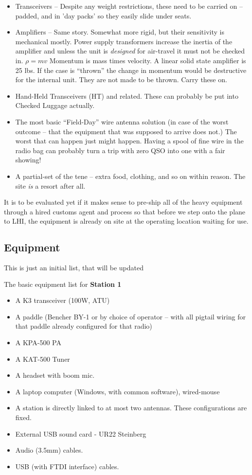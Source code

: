 \documentclass[11pt]{article}
\begin{document}
\begin{itemize}
\item Transceivers -- Despite any weight restrictions, these need to
be carried on -- padded, and in 'day packs' so they easily slide under
seats.
\item Amplifiers -- Same story.  Somewhat more rigid, but their sensitivity
is mechanical mostly.  Power supply transformers increase the inertia of the
amplifier and unless the unit is {\textit{designed}} for air-travel
it must not be checked in. $\rho = mv$  Momentum is mass times
velocity. A linear solid state amplifier is 25 lbs.  If the case is ``thrown''
the change in momentum would be destructive for the internal unit.  They are
not made to be thrown.  Carry these on.
\item Hand-Held Transceivers (HT) and related.  These can probably be put into Checked
Luggage actually.
\item The most basic ``Field-Day'' wire antenna solution (in case of the
worst outcome -- that the equipment that was supposed to arrive does not.)
The worst that can happen just might happen. Having a spool of fine wire
in the radio bag can probably turn a trip with zero QSO into one with a fair
showing!
\item A partial-set of the {\gls{tene}} -- extra food, clothing,
and so on within reason.  The site {\textit{is}} a resort after all.
\end{itemize}

It is to be evaluated yet if it makes sense to pre-ship all of the
heavy equipment through a hired customs agent and process so that
before we step onto the plane to LHI, the equipment is already
on site at the operating location waiting for use.

\subsection{Equipment}

This is just an initial list, that will be updated

The basic equipment list for {\textbf{Station 1}}

\begin{itemize}
\item A K3 transceiver (100W, ATU)
\item A paddle (Bencher BY-1 or by choice of operator -- with
all pigtail wiring for that paddle already configured for that radio)
\item A KPA-500 PA
\item A KAT-500 Tuner
\item A headset with boom mic.
\item A laptop computer (Windows, with common software), wired-mouse
\item A station is directly linked to at most two antennas. These
configurations are fixed.
\item External USB sound card - UR22 Steinberg
\item Audio (3.5mm) cables. 
\item USB (with FTDI interface) cables.
\end{itemize}
\end{document}
